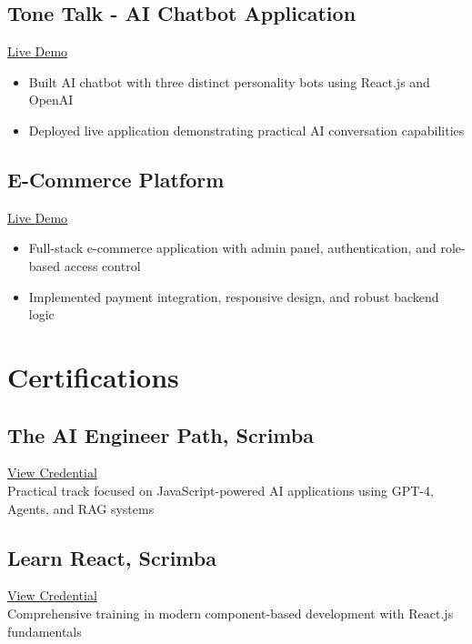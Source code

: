 \documentclass[a4,10pt]{article}
\newcommand{\subtext}[1]{
#1\par\vspace{-0.2cm}}
\newenvironment{zitemize}{
\begin{itemize}\itemsep0pt \parskip0pt \parsep1pt}
{\end{itemize}\vspace{-0.5cm}}
\newcommand{\citelink}[2]{\textcolor{UI_blue}{\href{#1}{\small #2}}}
\begin{document}
\subsection*{Tone Talk - AI Chatbot Application } 
\citelink{https://tone-talk.vercel.app/}{Live Demo}
    \begin{zitemize}
        \item Built AI chatbot with three distinct personality bots using React.js and OpenAI
        \item Deployed live application demonstrating practical AI conversation capabilities
    \end{zitemize}

\subsection*{E-Commerce Platform} 
\citelink{https://talha23-grain-du-sud.vercel.app/}{Live Demo}
    \begin{zitemize}
        \item Full-stack e-commerce application with admin panel, authentication, and role-based access control
        \item Implemented payment integration, responsive design, and robust backend logic
    \end{zitemize}


\vspace{0.05cm}
\section{Certifications}

\subsection*{The AI Engineer Path, {\normalsize \normalfont Scrimba}} 
\citelink{https://scrimba.com/certificate-cert24zAwJ77fGLr49QULJgVn5aJgBFPjWedt4xk2}{View Credential}\\
\subtext{Practical track focused on JavaScript-powered AI applications using GPT-4, Agents, and RAG systems}

\subsection*{Learn React, {\normalsize \normalfont Scrimba}}  
\citelink{https://scrimba.com/certificate-cert2uNjfK9m1kvFm3bjtDYkqz5RheHmTj4AjAp}{View Credential}\\
\subtext{Comprehensive training in modern component-based development with React.js fundamentals}
\end{document}
